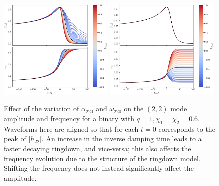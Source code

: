\documentclass[prd,amssymb,amsmath,amsfonts,nofootinbib,reprint,showpacs,longbibliography]{revtex4-1}
\begin{document}
\begin{figure}
    \includegraphics[width=0.49\textwidth]{figs/delta_alpha220_-0.8_1.0.png}
    \includegraphics[width=0.49\textwidth]{figs/delta_omg220_-0.8_1.0.png}
    \caption{\label{fig:qnmdev}
    Effect of the variation of $\alpha_{220}$ and $\omega_{220}$ on the $(2,2)$ mode amplitude and frequency
    for a binary with $q = 1, \chi_1 = \chi_2 = 0.6$. Waveforms here are aligned so that for each
    $t = 0$ corresponds to the peak of $|h_{22}|$. An increase in the inverse damping time leads to a faster
    decaying ringdown, and vice-versa; this also affects the frequency evolution due to the structure of the
    ringdown model. Shifting the frequency does not instead significantly affect the amplitude.}
\end{figure}
\end{document}
